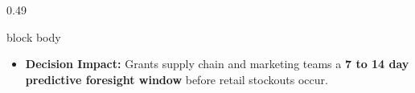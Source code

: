 \documentclass[aspectratio=169, 10pt]{beamer}
\newenvironment{card}[1][]{%
        \begin{beamercolorbox}[rounded=true,shadow=false,wd=\linewidth,sep=3.5pt,#1]{block body}%
        \fontsize{7.8pt}{9.8pt}\selectfont%
    }{%
        \end{beamercolorbox}%
    }
\begin{document}
\begin{frame}[t]
\begin{columns}[T]
\begin{column}{0.49\textwidth}
\begin{card}
\begin{itemize}
                        \item \textbf{Decision Impact:} Grants supply chain and marketing teams a \textbf{7 to 14 day predictive foresight window} before retail stockouts occur.                      
                    \end{itemize}                                                                                                                                                                      
                \end{card}                                                                                                                                                                             
            \end{column}                                                                                                                                                                               
                                                                                                                                                                                                       

\end{columns}
\end{frame}
\end{document}

